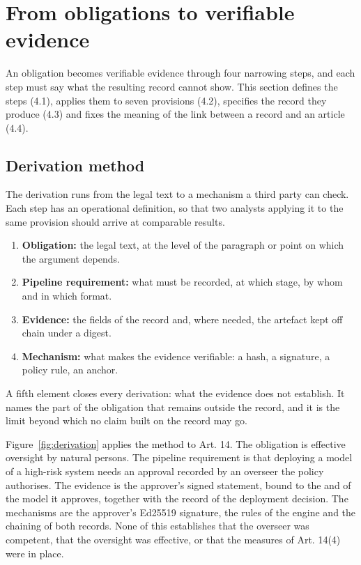 \section{From obligations to verifiable evidence}
\label{sec:derivation}

An obligation becomes verifiable evidence through four narrowing steps, and each step must say what the resulting record cannot show. This section defines the steps (4.1), applies them to seven provisions (4.2), specifies the record they produce (4.3) and fixes the meaning of the link between a record and an article (4.4).

\subsection{Derivation method}

The derivation runs from the legal text to a mechanism a third party can check. Each step has an operational definition, so that two analysts applying it to the same provision should arrive at comparable results.

\begin{enumerate}
\def\labelenumi{\arabic{enumi}.}
\tightlist
\item
  \textbf{Obligation:} the legal text, at the level of the paragraph or point on which the argument depends.
\item
  \textbf{Pipeline requirement:} what must be recorded, at which stage, by whom and in which format.
\item
  \textbf{Evidence:} the fields of the record and, where needed, the artefact kept off chain under a digest.
\item
  \textbf{Mechanism:} what makes the evidence verifiable: a hash, a signature, a policy rule, an anchor.
\end{enumerate}

A fifth element closes every derivation: what the evidence does not establish. It names the part of the obligation that remains outside the record, and it is the limit beyond which no claim built on the record may go.

Figure~\ref{fig:derivation} applies the method to Art. 14. The obligation is effective oversight by natural persons. The pipeline requirement is that deploying a model of a high-risk system needs an approval recorded by an overseer the policy authorises. The evidence is the approver's signed statement, bound to the  and  of the model it approves, together with the record of the deployment decision. The mechanisms are the approver's Ed25519 signature, the  rules of the engine and the chaining of both records. None of this establishes that the overseer was competent, that the oversight was effective, or that the measures of Art. 14(4) were in place.

